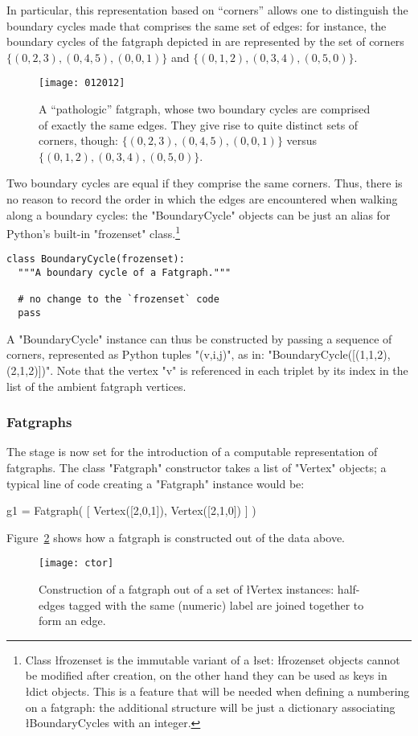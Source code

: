 In particular, this representation based on ``corners'' allows one to
distinguish the boundary cycles made that comprises the same set of
edges: for instance, the boundary cycles of the fatgraph depicted in
 are represented by the set of corners $\{(0, 2, 3),
(0, 4, 5), (0, 0, 1)\}$ and $\{(0, 1, 2), (0, 3, 4), (0, 5, 0)\}$.
\begin{figure}
  \centering
  \texttt{[image: 012012]}
  \caption{A ``pathologic'' fatgraph, whose two boundary cycles are
    comprised of exactly the same edges. They give rise to quite
    distinct sets of corners, though: $\{(0, 2, 3), (0, 4, 5), (0, 0,
    1)\}$ versus $\{(0, 1, 2), (0, 3, 4), (0, 5, 0)\}$.}
  \label{fig:012012}
\end{figure}

Two boundary cycles are equal if they comprise the same corners.
Thus, there is no reason to record the order in which the edges are
encountered when walking along a boundary cycles: the "BoundaryCycle"
objects can be just an alias for Python's built-in "frozenset"
class.\footnote{Class \l{frozenset} is the immutable variant of a
  \l{set}: \l{frozenset} objects cannot be modified after creation, on
  the other hand they can be used as keys in \l{dict} objects.  This
  is a feature that will be needed when defining a numbering on a
  fatgraph: the additional structure will be just a dictionary
  associating \l{BoundaryCycles} with an integer.}
\begin{lstlisting}
class BoundaryCycle(frozenset):
  """A boundary cycle of a Fatgraph."""

  # no change to the `frozenset` code
  pass 

\end{lstlisting}
A "BoundaryCycle" instance can thus be constructed by passing a
sequence of corners, represented as Python tuples "(v,i,j)", as in:
"BoundaryCycle([(1,1,2), (2,1,2)])".  Note that the vertex "v" is
referenced in each triplet by its index in the list of the ambient
fatgraph vertices.


\subsubsection{Fatgraphs}
\label{sec:fatgraphs}

The stage is now set for the introduction of a computable
representation of fatgraphs.  The class "Fatgraph" constructor takes a
list of "Vertex" objects; a typical line of code creating a "Fatgraph"
instance would be:
\begin{codexmp}
  g1 = Fatgraph( [ Vertex([2,0,1]), 
                   Vertex([2,1,0]) ] )
\end{codexmp}
Figure~\ref{fig:ctor} shows how a fatgraph is constructed out of the
data above.
\begin{figure}
  \centering
  \texttt{[image: ctor]}
  \caption{Construction of a fatgraph out of a set of
    \l{Vertex} instances: half-edges tagged with the same
    (numeric) label are joined together to form an edge.}
  \label{fig:ctor}
\end{figure}

